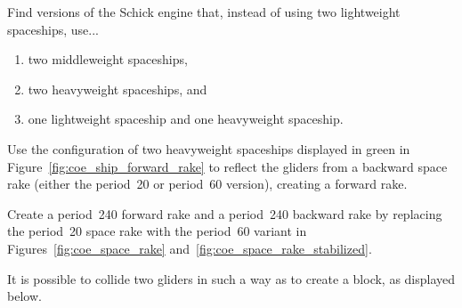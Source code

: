 \begin{multicols}{2}
	
	\mfilbreak
	
	
	\begin{problem}\label{exer:schick_mwss_hwss} 
		Find versions of the Schick engine that, instead of using two lightweight spaceships, use...\smallskip
		\begin{enumerate}[label=\bf\color{ocre}(\alph*)]
			\item two middleweight spaceships,
			
			\item two heavyweight spaceships, and
			
			\item one lightweight spaceship and one heavyweight spaceship.
		\end{enumerate}
	\end{problem}
	
	
	\mfilbreak
	
	
	\begin{problemstar}\label{exer:back_to_forward_space_rake} 
		Use the configuration of two heavyweight spaceships displayed in green in Figure~\ref{fig:coe_ship_forward_rake} to reflect the gliders from a backward space rake (either the period~20 or period~60 version), creating a forward rake.
	\end{problemstar}
	
	
	\mfilbreak
	
	
	\begin{problem}\label{exer:p240_rake} 
		Create a period~240 forward rake and a period~240 backward rake by replacing the period~20 space rake with the period~60 variant in Figures~\ref{fig:coe_space_rake} and~\ref{fig:coe_space_rake_stabilized}.
	\end{problem}
	
	
	\mfilbreak
	
	
	\begin{problem}\label{exer:space_rake_make_things} 
		It is possible to collide two gliders in such a way as to create a block, as displayed below.
		

\end{problem}
\end{multicols}
